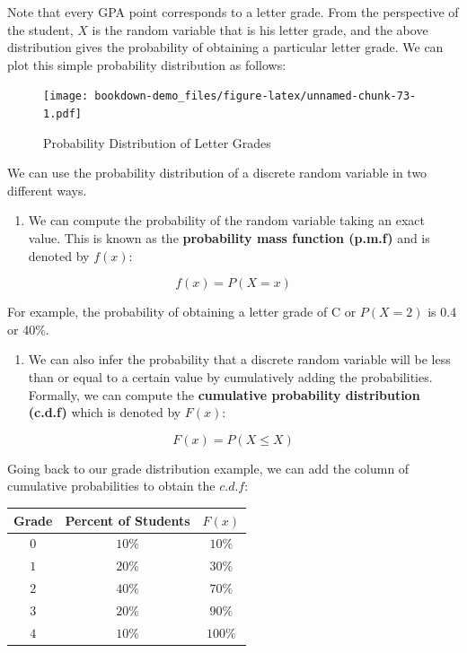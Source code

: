 \documentclass[
]{book}
\providecommand{\tightlist}{%
  \setlength{\itemsep}{0pt}\setlength{\parskip}{0pt}}
\theoremstyle{definition}
\theoremstyle{definition}
\theoremstyle{definition}
\theoremstyle{definition}
\theoremstyle{remark}
\begin{document}
Note that every GPA point corresponds to a letter grade. From the perspective of the student, \(X\) is the random variable that is his letter grade, and the above distribution gives the probability of obtaining a particular letter grade. We can plot this simple probability distribution as follows:

\begin{figure}
\centering
\texttt{[image: bookdown-demo\_files/figure-latex/unnamed-chunk-73-1.pdf]}
\caption{\label{fig:unnamed-chunk-73}Probability Distribution of Letter Grades}
\end{figure}

We can use the probability distribution of a discrete random variable in two different ways.

\begin{enumerate}
\def\labelenumi{\arabic{enumi}.}
\tightlist
\item
  We can compute the probability of the random variable taking an exact value. This is known as the \textbf{probability mass function (p.m.f)} and is denoted by \(f(x)\):
\end{enumerate}

\[f(x)=P(X=x)\]

For example, the probability of obtaining a letter grade of C or \(P(X=2)\) is 0.4 or 40\%.

\begin{enumerate}
\def\labelenumi{\arabic{enumi}.}
\setcounter{enumi}{1}
\tightlist
\item
  We can also infer the probability that a discrete random variable will be less than or equal to a certain value by cumulatively adding the probabilities. Formally, we can compute the \textbf{cumulative probability distribution (c.d.f)} which is denoted by \(F(x)\):
\end{enumerate}

\[F(x)=P(X\leq X)\]

Going back to our grade distribution example, we can add the column of cumulative probabilities to obtain the \(c.d.f\):

\begin{longtable}[]{@{}ccc@{}}
\toprule\noalign{}
Grade & Percent of Students & \(F(x)\) \\
\midrule\noalign{}
\endhead
\bottomrule\noalign{}
\endlastfoot
\(0\) & \(10\%\) & \(10\%\) \\
\(1\) & \(20\%\) & \(30\%\) \\
\(2\) & \(40\%\) & \(70\%\) \\
\(3\) & \(20\%\) & \(90\%\) \\
\(4\) & \(10\%\) & \(100\%\) \\
\end{longtable}
\end{document}
